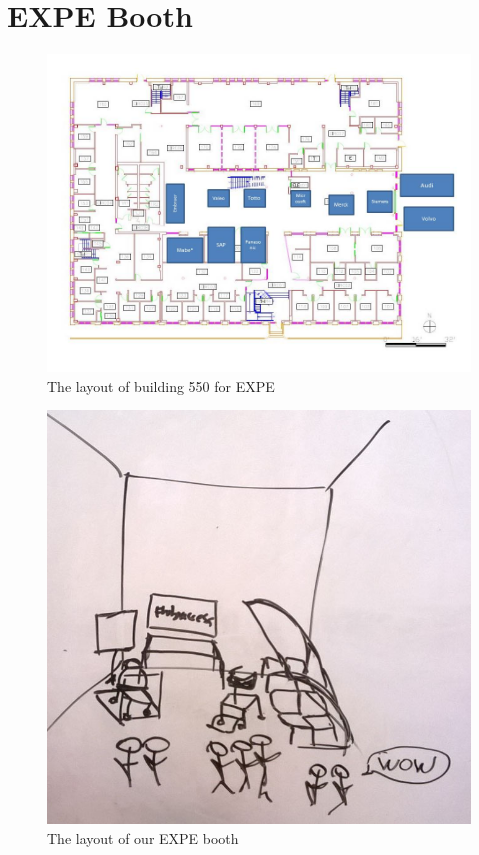 \section{EXPE Booth}
\begin{figure}
  \centering
     \includegraphics[scale=0.5]{images/EXPE_layout_class}
   \caption{The layout of building 550 for EXPE}
  \label{fig:EXPE_class}
\end{figure}

\begin{figure}
  \centering
     \includegraphics[scale=0.35]{images/EXPE_layout}
   \caption{The layout of our EXPE booth}
  \label{fig:EXPE_layout}
\end{figure}

